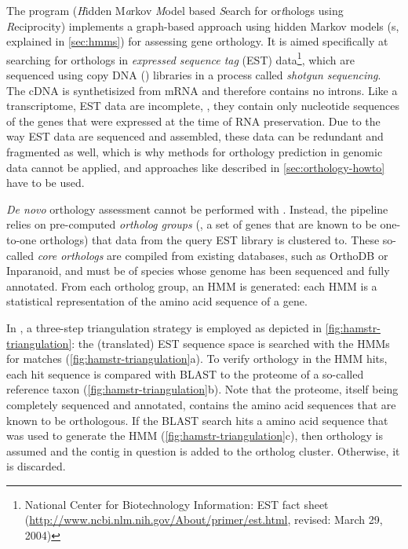 \label{sec:hamstr}
The program \hamstr (\emph{H}idden M\emph{a}rkov \emph{M}odel based
\emph{S}earch for or\emph{t}hologs using \emph{R}eciprocity) implements a
graph-based approach using hidden Markov models (s, explained in \autoref{sec:hmms}) for assessing gene orthology.
It is aimed specifically at searching for orthologs in \emph{expressed sequence
tag} (EST) data\footnote{National Center
for Biotechnology Information: EST fact sheet
(\url{http://www.ncbi.nlm.nih.gov/About/primer/est.html}, revised: March 29,
2004)}, which are sequenced using copy DNA ()
libraries in a process called \emph{shotgun sequencing}. The cDNA is
synthetisized from mRNA and therefore contains no introns. Like a transcriptome,
EST data are incomplete, \ie, they contain only nucleotide sequences of the
genes that were expressed at the time of RNA preservation. Due to the way EST
data are sequenced and assembled, these data can be redundant and fragmented as
well, which is why methods for orthology prediction in genomic data cannot be
applied, and approaches like described in \autoref{sec:orthology-howto} have to
be used.

\emph{De novo} orthology assessment cannot be performed with \hamstr. Instead,
the pipeline relies on pre-computed \emph{ortholog groups}
(, a set of genes
that are known to be one-to-one orthologs) that data from the query EST library
is clustered to. These so-called \emph{core orthologs} are compiled from
existing databases, such as OrthoDB or Inparanoid, and must be of species 
whose genome has been sequenced and fully annotated.
From each ortholog group, an HMM is generated: each HMM is a statistical
representation of the amino acid sequence of a gene. 

In \hamstr, a three-step triangulation strategy is employed as depicted in
\autoref{fig:hamstr-triangulation}: the (translated) EST sequence space is
searched with the HMMs for matches (\autoref{fig:hamstr-triangulation}a). To
verify orthology in the HMM hits, each hit sequence is compared with BLAST
\citep{altschul1997} to the proteome of a so-called reference taxon
(\autoref{fig:hamstr-triangulation}b). Note that the proteome, itself being
completely sequenced and annotated, contains the amino acid sequences that are
known to be orthologous. If the BLAST search hits a amino acid sequence that was
used to generate the HMM (\autoref{fig:hamstr-triangulation}c), then orthology
is assumed and the contig in question is added to the ortholog cluster.
Otherwise, it is discarded.

